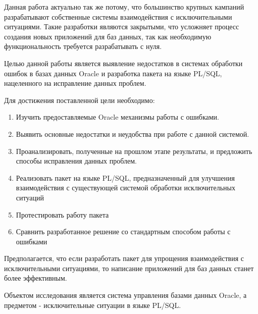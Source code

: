 Данная работа актуально так же потому, что большинство крупных кампаний разрабатывают собственные системы взаимодействия с исключительными ситуациями. Такие разработки являются закрытыми, что усложняет процесс создания новых приложений для баз данных, так как необходимую функциональность требуется разрабатывать с нуля.

Целью данной работы является выявление недостатков в системах обработки ошибок в базах данных Oracle и разработка пакета на языке PL/SQL, нацеленного на исправление данных проблем.

Для достижения поставленной цели необходимо:
\begin{enumerate}
	\item Изучить предоставляемые Oracle механизмы работы с ошибками.
	\item Выявить основные недостатки и неудобства при работе с данной системой.
	\item Проанализировать, полученные на прошлом этапе результаты, и предложить способы исправления данных проблем.
	\item Реализовать пакет на языке PL/SQL, предназначенный для улучшения взаимодействия с существующей системой обработки исключительных ситуаций
	\item Протестировать работу пакета
	\item Сравнить разработанное решение со стандартным способом работы с ошибками
\end{enumerate} 

Предполагается, что если разработать пакет для упрощения взаимодействия с исключительными ситуациями, то написание приложений для баз данных станет более эффективным. 

Объектом исследования является система управления базами данных Oracle, а предметом - исключительные ситуации в языке PL/SQL. 


\newpage %
